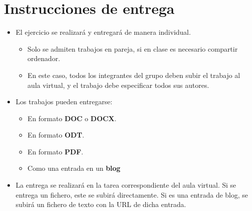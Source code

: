 \section{Instrucciones de entrega}
\begin{itemize}
\item El ejercicio se realizará y entregará de manera individual.
  \begin{itemize}
  \item Solo se admiten trabajos en pareja, si en clase es necesario compartir ordenador.
  \item En este caso, todos los integrantes del grupo deben subir el trabajo al aula virtual, y el trabajo debe especificar todos sus autores.
  \end{itemize}

\item Los trabajos pueden entregarse:
  \begin{itemize}
  \item En formato \textbf{DOC} o \textbf{DOCX}.
  \item En formato \textbf{ODT}.
  \item En formato \textbf{PDF}. 
  \item Como una entrada en un \textbf{blog} 

  \end{itemize}
  
\item La entrega se realizará en la tarea correspondiente del aula virtual. Si se entrega un fichero, este se subirá directamente. Si es una entrada de blog, se subirá un fichero de texto con la URL de dicha entrada.
\end{itemize}  






